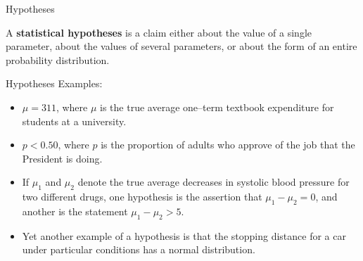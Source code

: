 \documentclass[
  ignorenonframetext,
]{beamer}
\providecommand{\tightlist}{%
  \setlength{\itemsep}{0pt}\setlength{\parskip}{0pt}}\usepackage{longtable,booktabs,array}
\begin{document}
\begin{frame}{Hypotheses}
\protect\hypertarget{hypotheses}{}
\begin{tcolorbox}[enhanced jigsaw, left=2mm, breakable, bottomrule=.15mm, colframe=quarto-callout-important-color-frame, arc=.35mm, leftrule=.75mm, colbacktitle=quarto-callout-important-color!10!white, titlerule=0mm, opacityback=0, coltitle=black, opacitybacktitle=0.6, colback=white, toprule=.15mm, toptitle=1mm, bottomtitle=1mm, title=\textcolor{quarto-callout-important-color}{\faExclamation}\hspace{0.5em}{Definition}, rightrule=.15mm]

A \textbf{statistical hypotheses} is a claim either about the value of a
single parameter, about the values of several parameters, or about the
form of an entire probability distribution.

\end{tcolorbox}
\end{frame}

\begin{frame}{Hypotheses}
\protect\hypertarget{hypotheses-1}{}
Examples:

\begin{itemize}[<+->]
\tightlist
\item
  \(\mu = 311\), where \(\mu\) is the true average one--term textbook
  expenditure for students at a university.
\item
  \(p < 0.50\), where \(p\) is the proportion of adults who approve of
  the job that the President is doing.
\item
  If \(\mu_{1}\) and \(\mu_{2}\) denote the true average decreases in
  systolic blood pressure for two different drugs, one hypothesis is the
  assertion that \(\mu_{1} - \mu_{2} = 0\), and another is the statement
  \(\mu_{1} - \mu_{2} > 5\).
\item
  Yet another example of a hypothesis is that the stopping distance for
  a car under particular conditions has a normal distribution.
\end{itemize}
\end{frame}
\end{document}
